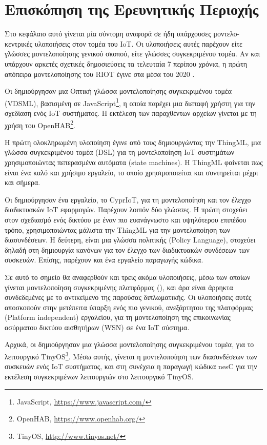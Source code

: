 \chapter{Επισκόπηση της Ερευνητικής Περιοχής}
\label{chapter:sota}

Στο κεφάλαιο αυτό γίνεται μία σύντομη αναφορά σε ήδη υπάρχουσες μοντελο-κεντρικές υλοποιήσεις στον τομέα του IoT. Οι υλοποιήσεις αυτές παρέχουν είτε γλώσσες μοντελοποίησης γενικού σκοπού, είτε γλώσσες συγκεκριμένου τομέα. Αν και υπάρχουν αρκετές σχετικές δημοσιεύσεις τα τελευταία 7 περίπου χρόνια, η πρώτη απόπειρα μοντελοποίησης του RIOT έγινε στα μέσα του 2020 \cite{bib:karaduman_2020}.

Οι \citet{bib:salihbegovic_2015} δημιούργησαν μια Οπτική γλώσσα μοντελοποίησης συγκεκριμένου τομέα (VDSML), βασισμένη σε JavaScript\footnote{JavaScript, \url{https://www.javascript.com/}}, η οποία παρέχει μια διεπαφή χρήστη για την σχεδίαση ενός IoT συστήματος. Η εκτέλεση των παραχθέντων αρχείων γίνεται με τη χρήση του OpenHAB\footnote{OpenHAB, \url{https://www.openhab.org/}}.

Η πρώτη ολοκληρωμένη υλοποίηση έγινε από τους \citet{bib:harrand_2016} δημιουργώντας την ThingML, μια γλώσσα συγκεκριμένου τομέα (DSL) για τη μοντελοποίηση IoT συστημάτων χρησιμοποιώντας πεπερασμένα αυτόματα (state machines). Η ThingML φαίνεται πως είναι ένα καλό και χρήσιμο εργαλείο, το οποίο χρησιμοποιείται και συντηρείται μέχρι και σήμερα.

Οι \citet{bib:berrouyne2019} δημιούργησαν ένα εργαλείο, το CyprIoT, για τη μοντελοποίηση και τον έλεγχο διαδικτυακών IoT εφαρμογών. Παρέχουν λοιπόν δύο γλώσσες. Η πρώτη στοχεύει στον σχεδιασμό ενός δικτύου με έναν πιο ευανάγνωστο και υψηλότερου επιπέδου τρόπο, χρησιμοποιώντας μάλιστα την ThingML για την μοντελοποίηση των διασυνδέσεων. Η δεύτερη, είναι μια γλώσσα πολιτικής (Policy Language), στοχεύει δηλαδή στη δημιουργία κανόνων για τον έλεγχο των διαδικτυακών συνδέσεων των συσκευών. Επίσης, παρέχουν και ένα εργαλείο παραγωγής κώδικα.

Σε αυτό το σημείο θα αναφερθούν και τρεις ακόμα υλοποιήσεις, μέσω των οποίων γίνεται μοντελοποίηση συγκεκριμένης πλατφόρμας (), και άρα είναι άρρηκτα συνδεδεμένες με το αντικείμενο της παρούσας διπλωματικής. Οι υλοποιήσεις αυτές αποσκοπούν στην μετέπειτα ύπαρξη ενός πιο γενικού, ανεξάρτητου της πλατφόρμας (Platform independent) εργαλείου, για τη μοντελοποίηση της επικοινωνίας ασύρματου δικτύου αισθητήρων (WSN) σε ένα IoT σύστημα. 

Αρχικά, οι \citet{bib:hussein_2018} δημιούργησαν μια γλώσσα μοντελοποίησης συγκεκριμένου τομέα, για το λειτουργικό TinyOS\footnote{TinyOS, \url{http://www.tinyos.net/}}. Μέσω αυτής, γίνεται η μοντελοποίηση των διασυνδέσεων των συσκευών ενός IoT συστήματος, και στη συνέχεια η παραγωγή κώδικα nesC \cite{bib:gay_2003} για την εκτέλεση συγκεκριμένων λειτουργιών στο λειτουργικό TinyOS. 

